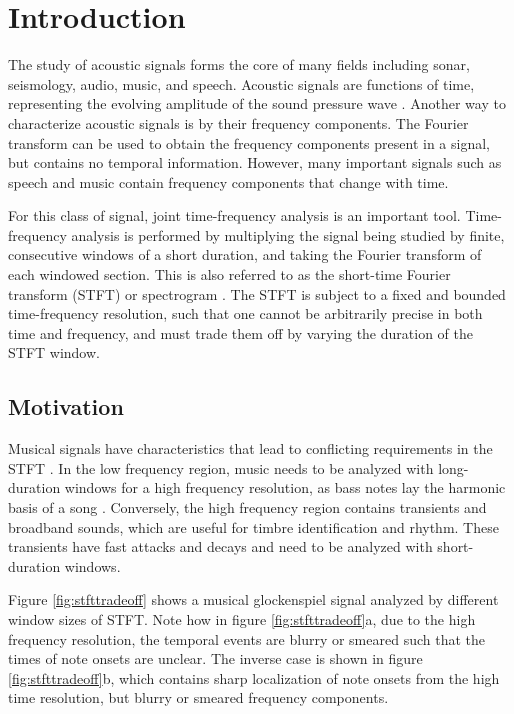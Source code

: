 \documentclass[report.tex]{subfiles}
\begin{document}
\section{Introduction}
\label{sec:intro}

The study of acoustic signals forms the core of many fields including sonar, seismology, audio, music, and speech. Acoustic signals are functions of time, representing the evolving amplitude of the sound pressure wave . Another way to characterize acoustic signals is by their frequency components. The Fourier transform can be used to obtain the frequency components present in a signal, but contains no temporal information. However, many important signals such as speech and music contain frequency components that change with time.

For this class of signal, joint time-frequency analysis is an important tool. Time-frequency analysis is performed by multiplying the signal being studied by finite, consecutive windows of a short duration, and taking the Fourier transform of each windowed section. This is also referred to as the short-time Fourier transform (STFT) or spectrogram . The STFT is subject to a fixed and bounded time-frequency resolution, such that one cannot be arbitrarily precise in both time and frequency, and must trade them off by varying the duration of the STFT window.

\subsection{Motivation}

Musical signals have characteristics that lead to conflicting requirements in the STFT \cite{doerflerphd}. In the low frequency region, music needs to be analyzed with long-duration windows for a high frequency resolution, as bass notes lay the harmonic basis of a song . Conversely, the high frequency region contains transients and broadband sounds, which are useful for timbre identification and rhythm. These transients have fast attacks and decays and need to be analyzed with short-duration windows.

Figure \ref{fig:stfttradeoff} shows a musical glockenspiel signal analyzed by different window sizes of STFT. Note how in figure \ref{fig:stfttradeoff}a, due to the high frequency resolution, the temporal events are blurry or smeared such that the times of note onsets are unclear. The inverse case is shown in figure \ref{fig:stfttradeoff}b, which contains sharp localization of note onsets from the high time resolution, but blurry or smeared frequency components.
\end{document}
